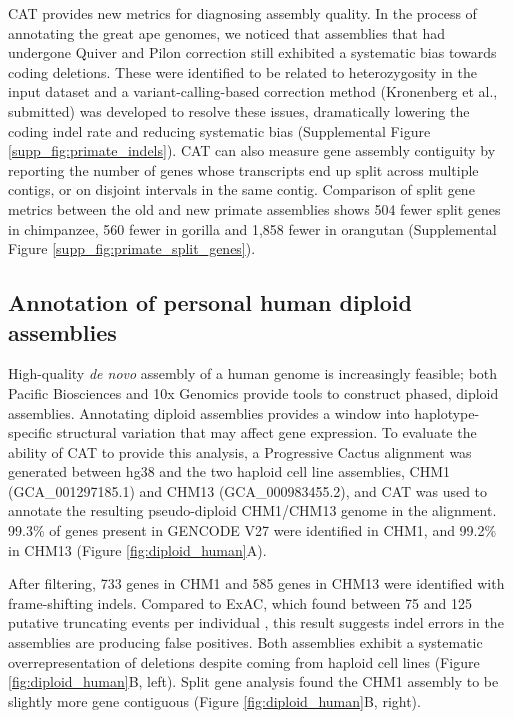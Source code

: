 \documentclass[fleqn,10pt]{wlscirep}
\begin{document}
CAT provides new metrics for diagnosing assembly quality. In the process of annotating the great ape genomes, we noticed that assemblies that had undergone Quiver and Pilon \cite{walker2014pilon} correction still exhibited a systematic bias towards coding deletions. These were identified to be related to heterozygosity in the input dataset and a variant-calling-based correction method (Kronenberg et al., submitted) was developed to resolve these issues, dramatically lowering the coding indel rate and reducing systematic bias (Supplemental Figure \ref{supp_fig:primate_indels}). CAT can also measure gene assembly contiguity by reporting the number of genes whose transcripts end up split across multiple contigs, or on disjoint intervals in the same contig. Comparison of split gene metrics between the old and new primate assemblies shows 504 fewer split genes in chimpanzee, 560 fewer in gorilla and 1,858 fewer in orangutan (Supplemental Figure \ref{supp_fig:primate_split_genes}).


\subsection*{Annotation of personal human diploid assemblies}

High-quality \textit{de novo} assembly of a human genome is increasingly feasible; both Pacific Biosciences \cite{chin2016phased,huddleston2016discovery,korlach2017novo} and 10x Genomics \cite{Weisenfeld070425} provide tools to construct phased, diploid assemblies. Annotating diploid assemblies provides a window into haplotype-specific structural variation that may affect gene expression. To evaluate the ability of CAT to provide this analysis, a Progressive Cactus alignment was generated between hg38 and the two haploid cell line assemblies, CHM1 (GCA\_001297185.1) and CHM13 (GCA\_000983455.2), and CAT was used to annotate the resulting pseudo-diploid CHM1/CHM13 genome in the alignment. 99.3\% of genes present in GENCODE V27 were identified in CHM1, and 99.2\% in CHM13 (Figure \ref{fig:diploid_human}A). 
  
After filtering, 733 genes in CHM1 and 585 genes in CHM13 were identified with frame-shifting indels. Compared to ExAC, which found between 75 and 125 putative truncating events per individual \cite{karczewski2016exac}, this result suggests indel errors in the assemblies are producing false positives. Both assemblies exhibit a systematic overrepresentation of deletions despite coming from haploid cell lines (Figure \ref{fig:diploid_human}B, left). Split gene analysis found the CHM1 assembly to be slightly more gene contiguous (Figure \ref{fig:diploid_human}B, right).
\end{document}
